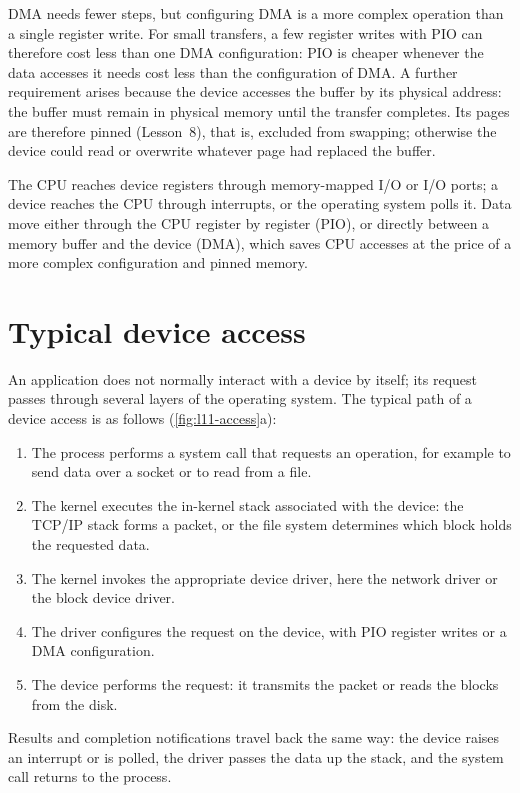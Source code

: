\documentclass[../main.tex]{subfiles}
\begin{document}
DMA needs fewer steps, but configuring DMA is a more complex operation than
a single register write.  For small transfers, a few register writes with
PIO can therefore cost less than one DMA configuration: PIO is cheaper
whenever the data accesses it needs cost less than the configuration of
DMA.  A further requirement arises
because the device accesses the buffer by its physical address: the buffer
must remain in physical memory until the transfer completes.  Its pages are
therefore pinned
(Lesson~8), that is, excluded from swapping; otherwise
the device could read or overwrite whatever page had replaced the
buffer.

\begin{keypoint}
  The CPU reaches device registers through memory-mapped I/O or I/O ports;
  a device reaches the CPU through interrupts, or the operating system polls
  it.  Data move either through the CPU register by register (PIO), or
  directly between a memory buffer and the device (DMA), which saves CPU
  accesses at the price of a more complex configuration and pinned memory.
\end{keypoint}

\section{Typical device access}
\label{sec:l11-access}

An application does not normally interact with a device by itself; its
request passes through several layers of the operating
system.  The
typical path of a device access is as follows (\cref{fig:l11-access}a):
\begin{enumerate}
  \item The process performs a system call that requests an operation, for
    example to send data over a socket or to read from a file.
  \item The kernel executes the in-kernel stack associated with the device:
    the TCP/IP stack forms a packet, or the file system determines which
    block holds the requested data.
  \item The kernel invokes the appropriate device driver, here the network
    driver or the block device driver.
  \item The driver configures the request on the device, with PIO register
    writes or a DMA configuration.
  \item The device performs the request: it transmits the packet or reads
    the blocks from the disk.
\end{enumerate}
Results and completion notifications travel back the same way: the device
raises an interrupt or is polled, the driver passes the data up the stack,
and the system call returns to the process.
\end{document}
